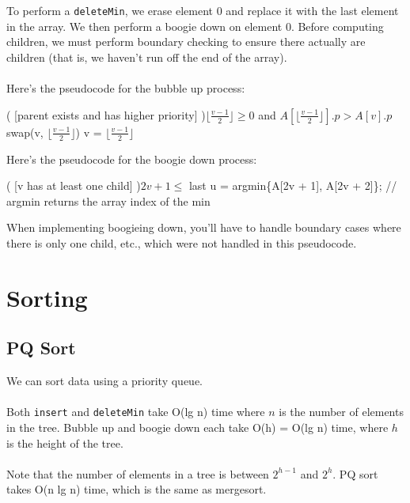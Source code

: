 \documentclass[]{article}
\theoremstyle{definition}
\begin{document}
\begin{enumerate}
						\\ \\
						To perform a \verb+deleteMin+, we erase element 0 and replace it with the last element in the array. We then perform a boogie down on element 0. Before computing children, we must perform boundary checking to ensure there actually are children (that is, we haven't run off the end of the array).
						\\ \\
						Here's the pseudocode for the bubble up process: \\
						\begin{algorithm}[H]
							\While( [parent exists and has higher priority] ){$\lfloor \frac{v - 1}{2} \rfloor \ge 0$ and $A[\lfloor \frac{v - 1}{2} \rfloor].p > A[v].p$}{ 
								swap(v, $\lfloor \frac{v - 1}{2} \rfloor$)\;
								v = $\lfloor \frac{v - 1}{2} \rfloor$\;
							}
						\end{algorithm}

						Here's the pseudocode for the boogie down process: \\
						\begin{algorithm}[H]
							\While( [v has at least one child] ){$2v + 1 \le$ last}{
								u = argmin\{A[2v + 1], A[2v + 2]\}; // argmin returns the array index of the min \\
							}
						\end{algorithm}
						
						When implementing boogieing down, you'll have to handle boundary cases where there is only one child, etc., which were not handled in this pseudocode.
				\end{enumerate}
	\section{Sorting}
		\subsection{PQ Sort}
			We can sort data using a priority queue. \\ \\
			Both \verb+insert+ and \verb+deleteMin+ take O(lg n) time where $n$ is the number of elements in the tree. Bubble up and boogie down each take O(h) = O(lg n) time, where $h$ is the height of the tree.
			\\ \\
			Note that the number of elements in a tree is between $2^{h - 1}$ and $2^h$. PQ sort takes O(n lg n) time, which is the same as mergesort.
		
\end{document}

